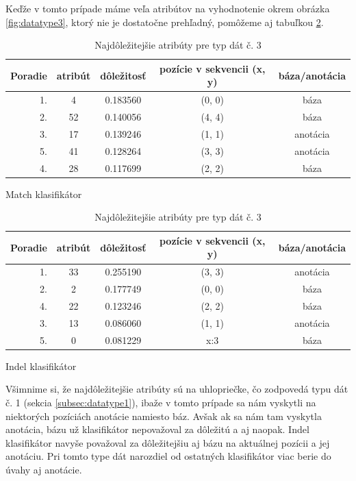 Keďže v tomto prípade máme veľa atribútov na vyhodnotenie okrem obrázka \ref{fig:datatype3}, ktorý nie je dostatočne prehľadný, pomôžeme aj tabuľkou \ref{tab:datatype3}.
\begin{table}[htp]
\centering
\begin{subtable}{\textwidth}
\centering
\begin{tabular}{r|cccc}
Poradie & atribút & dôležitosť & pozície v sekvencii (x, y) & báza/anotácia\\
\hline
1. & 4 & 0.183560 & (0, 0) & báza\\
2. & 52 & 0.140056 & (4, 4) & báza\\
3. & 17 & 0.139246 & (1, 1) & anotácia\\
5. & 41 & 0.128264 & (3, 3) & anotácia\\
4. & 28 & 0.117699 & (2, 2) & báza\\
\end{tabular}
\caption{Match klasifikátor}
\end{subtable}

\begin{subtable}{\textwidth}
\centering
\begin{tabular}{r|cccc}
Poradie & atribút & dôležitosť & pozície v sekvencii (x, y) & báza/anotácia\\
\hline
1. & 33 & 0.255190 & (3, 3) & anotácia\\
2. & 2 & 0.177749 & (0, 0) & báza\\
4. & 22 & 0.123246 & (2, 2) & báza\\
3. & 13 & 0.086060 & (1, 1) & anotácia\\
5. & 0 & 0.081229 & x:3 & báza\\
\end{tabular}
\caption{Indel klasifikátor}
\end{subtable}
\caption[Najdôležitejšie atribúty pre typ dát č. 3]{Najdôležitejšie atribúty pre typ dát č. 3}
\label{tab:datatype3}
\end{table}

Všimnime si, že najdôležitejšie atribúty sú na uhlopriečke, čo zodpovedá typu dát č. 1 (sekcia \ref{subsec:datatype1}), ibaže v tomto prípade sa nám vyskytli na niektorých pozíciách anotácie namiesto báz.
Avšak ak sa nám tam vyskytla anotácia, bázu už klasifikátor nepovažoval za dôležitú a aj naopak.
Indel klasifikátor navyše považoval za dôležitejšiu aj bázu na aktuálnej pozícii a jej anotáciu.
Pri tomto type dát narozdiel od ostatných klasifikátor viac berie do úvahy aj anotácie.

